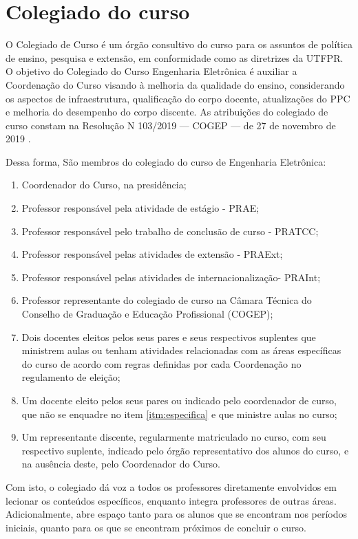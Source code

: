 \section{Colegiado do curso}

O Colegiado de Curso é um órgão consultivo do curso para os assuntos de política de ensino, pesquisa e extensão, em conformidade como as diretrizes da UTFPR. O objetivo do Colegiado do Curso Engenharia Eletrônica é auxiliar a Coordenação do Curso visando à melhoria da qualidade do ensino, considerando os aspectos de infraestrutura, qualificação do corpo docente, atualizações do PPC e melhoria do desempenho do corpo discente. As atribuições do colegiado de curso constam na Resolução N\textordmasculine{} 103/2019 — COGEP — de 27 de novembro de 2019 \cite{cogep103}.

Dessa forma, São membros do colegiado do curso de Engenharia Eletrônica:

\begin{enumerate}
    \item Coordenador do Curso, na presidência;
    \item Professor responsável pela atividade de estágio - PRAE;
    \item Professor responsável pelo trabalho de conclusão de curso - PRATCC;
    \item Professor responsável pelas atividades de extensão - PRAExt;
    \item Professor responsável pelas atividades de internacionalização- PRAInt;
    \item Professor representante do colegiado de curso na Câmara Técnica do Conselho de Graduação e Educação Profissional (COGEP);
    \item \label{itm:especifica}Dois docentes eleitos pelos seus pares e seus respectivos suplentes que ministrem aulas ou tenham atividades relacionadas com as áreas específicas do curso de acordo com regras definidas por cada Coordenação no regulamento de eleição;
    \item Um docente eleito pelos seus pares ou indicado pelo coordenador de curso, que não se enquadre no item \ref{itm:especifica} e que ministre aulas no curso;
    \item Um representante discente, regularmente matriculado no curso, com seu respectivo suplente, indicado pelo órgão representativo dos alunos do curso, e na ausência deste, pelo Coordenador do Curso.
\end{enumerate}

Com isto, o colegiado dá voz a todos os professores diretamente envolvidos em lecionar os conteúdos específicos, enquanto integra professores de outras áreas. Adicionalmente, abre espaço tanto para os alunos que se encontram nos períodos iniciais, quanto para os que se encontram próximos de concluir o curso.

